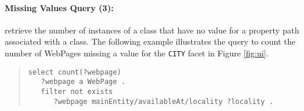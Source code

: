 \paragraph{Missing Values Query (3):} retrieve the number of instances of a class that have no value for a property path associated with a class.
The following example illustrates the query to count the number of WebPages missing a value for the \verb|CITY| facet in Figure \ref{fig:ui}.
\begin{quote}
{\footnotesize
\begin{verbatim}
select count(?webpage)
   ?webpage a WebPage .
   filter not exists
      ?webpage mainEntity/availableAt/locality ?locality .
\end{verbatim}}
\end{quote}
